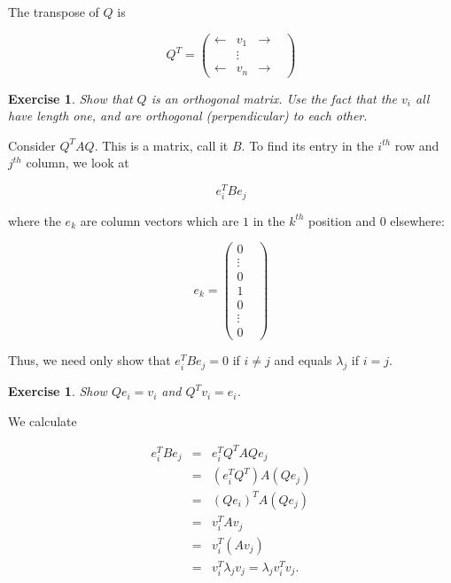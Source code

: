 \documentclass[12pt,letterpaper]{report}
\newcommand\be{\begin{equation}}
\newcommand\ee{\end{equation}}
\newcommand\bea{\begin{eqnarray}}
\newcommand\eea{\end{eqnarray}}
\newtheorem{exe}[thm]{Exercise}
\begin{document}
The transpose of $Q$ is

\be Q^T = \left(\begin{array}{cccc}
                        \leftarrow  &  v_1 &  \rightarrow &  \\
                        \ &   \vdots & \ &  \\
                        \leftarrow  & v_n   &  \rightarrow &
                          \end{array}\right)
\ee

\begin{exe} Show that $Q$ is an orthogonal matrix. Use the fact
that the $v_i$ all have length one, and are orthogonal
(perpendicular) to each other. \end{exe}

Consider $Q^T A Q$. This is a matrix, call it $B$. To find its
entry in the $i^{th}$ row and $j^{th}$ column, we look at

\be e_i^T B e_j \ee

where the $e_k$ are column vectors which are $1$ in the $k^{th}$
position and $0$ elsewhere:

\be e_k = \left(\begin{array}{cc}
                        0 &  \\
                        \vdots &  \\
                        0 & \\
                        1 & \\
                        0 & \\
                        \vdots & \\
                        0 &
                          \end{array}\right)
\ee

Thus, we need only show that $e_i^T B e_j = 0$ if $i \neq j$ and
equals $\lambda_j$ if $i = j$.

\begin{exe} Show $Q e_i = v_i$ and $Q^T v_i = e_i$. \end{exe}

We calculate

\bea e_i^T B e_j & = & e_i^T Q^T A Q e_j \nonumber\\ &=& (e_i^T
Q^T) A (Q e_j) \nonumber\\ &=& (Q e_i)^T A (Q e_j) \nonumber\\ &=&
v_i^T A v_j \nonumber\\ &=& v_i^T (A v_j) \nonumber\\ &=& v_i^T
\lambda_j v_j = \lambda_j v_i^T v_j. \eea
\end{document}
